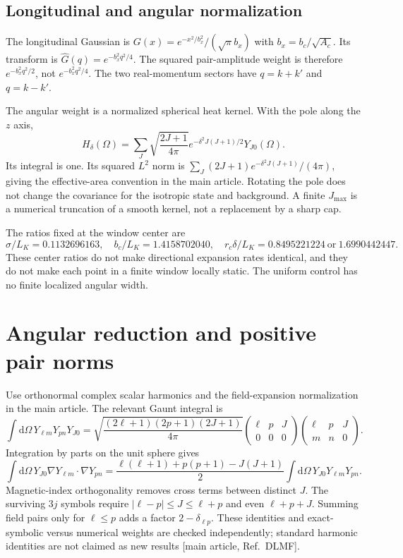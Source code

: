 \documentclass[10pt]{article}
\newcommand{\dd}{\mathrm d}
\begin{document}
\subsection{Longitudinal and angular normalization}
The longitudinal Gaussian is $G(x)=e^{-x^2/b_x^2}/(\sqrt\pi b_x)$ with $b_x=b_c/\sqrt{A_c}$. Its transform is $\widehat G(q)=e^{-b_x^2q^2/4}$. The squared pair-amplitude weight is therefore $e^{-b_x^2q^2/2}$, not $e^{-b_x^2q^2/4}$. The two real-momentum sectors have $q=k+k'$ and $q=k-k'$.

The angular weight is a normalized spherical heat kernel. With the pole along the $z$ axis,
\begin{equation}
 H_\delta(\Omega)=\sum_J\sqrt{\frac{2J+1}{4\pi}}
 e^{-\delta^2J(J+1)/2}Y_{J0}(\Omega).
\end{equation}
Its integral is one. Its squared $L^2$ norm is $\sum_J(2J+1)e^{-\delta^2J(J+1)}/(4\pi)$, giving the effective-area convention in the main article. Rotating the pole does not change the covariance for the isotropic state and background. A finite $J_{\max}$ is a numerical truncation of a smooth kernel, not a replacement by a sharp cap.

The ratios fixed at the window center are
\begin{equation}
 \sigma/L_K=0.1132696163,\quad b_c/L_K=1.4158702040,
 \quad r_c\delta/L_K=0.8495221224\ \text{or}\ 1.6990442447.
\end{equation}
These center ratios do not make directional expansion rates identical, and they do not make each point in a finite window locally static. The uniform control has no finite localized angular width.

\section{Angular reduction and positive pair norms}
Use orthonormal complex scalar harmonics and the field-expansion normalization in the main article. The relevant Gaunt integral is
\begin{equation}
 \int\dd\Omega\,Y_{\ell m}Y_{p n}Y_{J0}
 =\sqrt{\frac{(2\ell+1)(2p+1)(2J+1)}{4\pi}}
 \begin{pmatrix}\ell&p&J\\0&0&0\end{pmatrix}
 \begin{pmatrix}\ell&p&J\\m&n&0\end{pmatrix}.
\end{equation}
Integration by parts on the unit sphere gives
\begin{equation}
 \int\dd\Omega\,Y_{J0}\nabla Y_{\ell m}\cdot\nabla Y_{pn}
 =\frac{\ell(\ell+1)+p(p+1)-J(J+1)}{2}
 \int\dd\Omega\,Y_{J0}Y_{\ell m}Y_{pn}.
\end{equation}
Magnetic-index orthogonality removes cross terms between distinct $J$. The surviving $3j$ symbols require $|\ell-p|\leq J\leq\ell+p$ and even $\ell+p+J$. Summing field pairs only for $\ell\leq p$ adds a factor $2-\delta_{\ell p}$. These identities and exact-symbolic versus numerical weights are checked independently; standard harmonic identities are not claimed as new results [main article, Ref.~DLMF].
\end{document}
